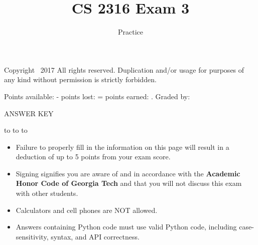 \documentclass[addpoints,9pt]{exam}
\title{CS 2316 Exam 3}
\date{Practice}
\begin{document}
\maketitle
\thispagestyle{head}


\runningheader{}
              {\tiny Copyright \textcopyright\ 2017 All rights reserved. Duplication and/or usage for purposes of any kind without permission is strictly forbidden.}
              {}

              {}
              {Points available: \pointsonpage{\thepage} -
               points lost: \makebox[.5in]{\hrulefill} =
               points earned:  \makebox[.5in]{\hrulefill}.
              Graded by: \makebox[.5in]{\hrulefill}}


\ifprintanswers
\begin{center}
{\LARGE ANSWER KEY}
\end{center}
\else
\vspace{0.1in}
\hbox to \textwidth{Name (print clearly): \enspace\hrulefill}
\vspace{0.3in}
\hbox to 
\vspace{0.3in}
\hbox to \textwidth{Signature: \enspace\hrulefill}

\fi

\vfill

\begin{itemize}
\item Failure to properly fill in the information on this page will result in a deduction of up to 5 points from your exam score.
\item Signing signifies you are aware of and in accordance with the {\bf Academic Honor Code of Georgia Tech} and that you will not discuss this exam with other students.
\item Calculators and cell phones are NOT allowed.
\item Answers containing Python code must use valid Python code, including case-sensitivity, syntax, and API correctness.
\end{itemize}

\vfill
\end{document}
